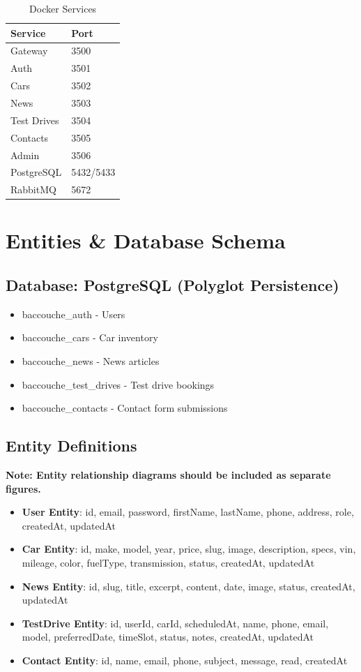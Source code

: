 \documentclass[12pt,a4paper]{article}
\begin{document}
\begin{table}[h]
\centering
\caption{Docker Services}
\begin{tabular}{@{}ll@{}}
\toprule
Service & Port \\
\midrule
Gateway & 3500 \\
Auth & 3501 \\
Cars & 3502 \\
News & 3503 \\
Test Drives & 3504 \\
Contacts & 3505 \\
Admin & 3506 \\
PostgreSQL & 5432/5433 \\
RabbitMQ & 5672 \\
\bottomrule
\end{tabular}
\end{table}

\newpage

\section{Entities \& Database Schema}
\label{sec:entities}

\subsection{Database: PostgreSQL (Polyglot Persistence)}

\begin{itemize}
    \item baccouche\_auth - Users
    \item baccouche\_cars - Car inventory
    \item baccouche\_news - News articles
    \item baccouche\_test\_drives - Test drive bookings
    \item baccouche\_contacts - Contact form submissions
\end{itemize}

\subsection{Entity Definitions}

\bigskip
\noindent\textbf{Note: Entity relationship diagrams should be included as separate figures.}
\begin{itemize}
    \item \textbf{User Entity}: id, email, password, firstName, lastName, phone, address, role, createdAt, updatedAt
    \item \textbf{Car Entity}: id, make, model, year, price, slug, image, description, specs, vin, mileage, color, fuelType, transmission, status, createdAt, updatedAt
    \item \textbf{News Entity}: id, slug, title, excerpt, content, date, image, status, createdAt, updatedAt
    \item \textbf{TestDrive Entity}: id, userId, carId, scheduledAt, name, phone, email, model, preferredDate, timeSlot, status, notes, createdAt, updatedAt
    \item \textbf{Contact Entity}: id, name, email, phone, subject, message, read, createdAt
\end{itemize}
\end{document}
